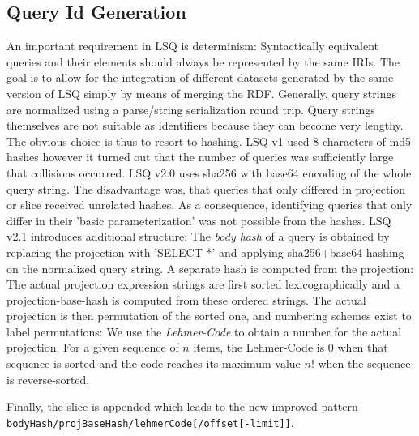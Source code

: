 

\subsection{Query Id Generation}
An important requirement in LSQ is determinism: Syntactically equivalent queries and their elements should always be represented by the same IRIs. The goal is to allow for the integration of different datasets generated by the same version of LSQ simply by means of merging the RDF.
Generally, query strings are normalized using a parse/string serialization round trip.
Query strings themselves are not suitable as identifiers because they can become very lengthy.
The obvious choice is thus to resort to hashing. LSQ v1 used 8 characters of md5 hashes however it turned out that the number of queries was sufficiently large that collisions occurred.
LSQ v2.0 uses sha256 with base64 encoding of the whole query string. The disadvantage was,
that queries that only differed in projection or slice received unrelated hashes. As a consequence, identifying queries that only differ in their 'basic parameterization' was not possible from the hashes.
LSQ v2.1 introduces additional structure:
The \emph{body hash} of a query is obtained by replacing the projection with 'SELECT *' and applying sha256+base64 hashing on the normalized query string.
A separate hash is computed from the projection: 
The actual projection expression strings are first sorted lexicographically and a projection-base-hash is computed from these ordered strings. The actual projection is then permutation of the sorted one, and numbering schemes exist to label permutations:
We use the \emph{Lehmer-Code} to obtain a number for the actual projection.
For a given sequence of $n$ items, the Lehmer-Code is 0 when that sequence is sorted and the code reaches its maximum value $n!$ when the sequence is reverse-sorted.

Finally, the slice is appended which leads to the new improved pattern
\texttt{bodyHash/projBaseHash/lehmerCode[/offset[-limit]]}.

